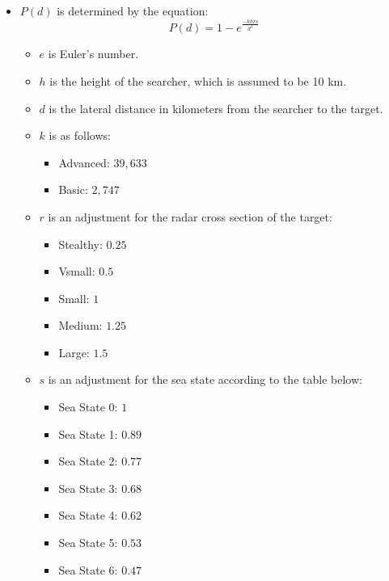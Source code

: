 \documentclass{article}
\begin{document}
    \begin{itemize}
        \item \( P(d) \) is determined by the equation:
        \[
        P(d) = 1 - e^{\frac{-khrs}{d^3}}
        \]
        \begin{itemize}
            \item \( e \) is Euler’s number.
            \item \( h \) is the height of the searcher, which is assumed to be 10 km.
            \item \( d \) is the lateral distance in kilometers from the searcher to the target.
            \item \( k \) is as follows:
            \begin{itemize}
                \item Advanced: \( 39{,}633 \)
                \item Basic: \( 2{,}747 \)
            \end{itemize}
            \item \( r \) is an adjustment for the radar cross section of the target:
            \begin{itemize}
                \item Stealthy: \( 0.25 \)
                \item Vsmall: \( 0.5 \)
                \item Small: \( 1 \)
                \item Medium: \( 1.25 \)
                \item Large: \( 1.5 \)
            \end{itemize}
            \item \( s \) is an adjustment for the sea state according to the table below:
            \begin{itemize}
                \item Sea State 0: \( 1 \)
                \item Sea State 1: \( 0.89 \)
                \item Sea State 2: \( 0.77 \)
                \item Sea State 3: \( 0.68 \)
                \item Sea State 4: \( 0.62 \)
                \item Sea State 5: \( 0.53 \)
                \item Sea State 6: \( 0.47 \)
            \end{itemize}
        \end{itemize}
    \end{itemize}
\end{document}
